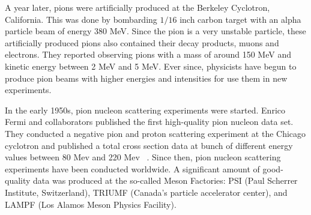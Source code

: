 A year later, pions were artificially produced at the Berkeley Cyclotron, California\cite{FirstPionsBerkeley}. This was done by bombarding $1/16$ inch carbon target with an alpha particle beam of energy 380 MeV. Since the pion is a very unstable particle, these artificially produced pions also contained their decay products, muons and electrons. They reported observing pions with a mass of around 150 MeV and kinetic energy between 2 MeV and 5 MeV. Ever since, physicists have begun to produce pion beams with higher energies and intensities for use them in new experiments.


In the early 1950s, pion nucleon scattering experiments were started. Enrico Fermi and collaborators published the first high-quality pion nucleon data set. They conducted a negative pion and proton scattering experiment at the Chicago cyclotron and published a total cross section data at bunch of different energy values between 80 Mev and 220 Mev  \cite{PiNScatteringFermi1952}. Since then, pion nucleon scattering experiments have been conducted worldwide. A significant amount of good-quality data was produced at the so-called Meson Factories: PSI (Paul Scherrer Institute, Switzerland), TRIUMF (Canada's particle accelerator center), and LAMPF (Los Alamos Meson Physics Facility).